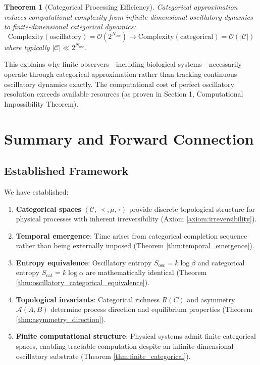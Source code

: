\documentclass[12pt,a4paper]{article}
\newtheorem{theorem}{Theorem}
\begin{document}
\begin{theorem}[Categorical Processing Efficiency]
\label{thm:categorical_efficiency}
Categorical approximation reduces computational complexity from infinite-dimensional oscillatory dynamics to finite-dimensional categorical dynamics:
\begin{equation}
\text{Complexity}(\text{oscillatory}) = \mathcal{O}(2^{N_{\text{osc}}}) \to \text{Complexity}(\text{categorical}) = \mathcal{O}(|\mathcal{C}|)
\end{equation}
where typically $|\mathcal{C}| \ll 2^{N_{\text{osc}}}$.
\end{theorem}

This explains why finite observers—including biological systems—necessarily operate through categorical approximation rather than tracking continuous oscillatory dynamics exactly. The computational cost of perfect oscillatory resolution exceeds available resources (as proven in Section 1, Computational Impossibility Theorem).

\section{Summary and Forward Connection}

\subsection{Established Framework}

We have established:

\begin{enumerate}
\item \textbf{Categorical spaces} $(\mathcal{C}, \prec, \mu, \tau)$ provide discrete topological structure for physical processes with inherent irreversibility (Axiom \ref{axiom:irreversibility}).

\item \textbf{Temporal emergence}: Time arises from categorical completion sequence rather than being externally imposed (Theorem \ref{thm:temporal_emergence}).

\item \textbf{Entropy equivalence}: Oscillatory entropy $S_{\text{osc}} = k \log \beta$ and categorical entropy $S_{\text{cat}} = k \log \alpha$ are mathematically identical (Theorem \ref{thm:oscillatory_categorical_equivalence}).

\item \textbf{Topological invariants}: Categorical richness $R(C)$ and asymmetry $\mathcal{A}(A,B)$ determine process direction and equilibrium properties (Theorem \ref{thm:asymmetry_direction}).

\item \textbf{Finite computational structure}: Physical systems admit finite categorical spaces, enabling tractable computation despite an infinite-dimensional oscillatory substrate (Theorem \ref{thm:finite_categorical}).
\end{enumerate}
\end{document}
